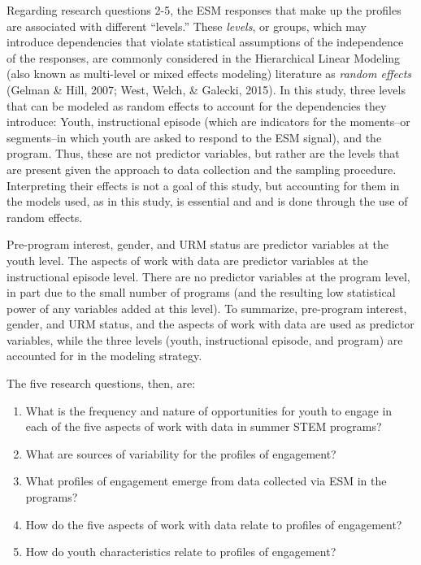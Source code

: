 \documentclass[]{msu-thesis}
\providecommand{\tightlist}{%
  \setlength{\itemsep}{0pt}\setlength{\parskip}{0pt}}
\theoremstyle{definition}
\theoremstyle{definition}
\theoremstyle{definition}
\theoremstyle{remark}
\begin{document}
Regarding research questions 2-5, the ESM responses that make up the
profiles are associated with different ``levels.'' These \emph{levels},
or groups, which may introduce dependencies that violate statistical
assumptions of the independence of the responses, are commonly
considered in the Hierarchical Linear Modeling (also known as
multi-level or mixed effects modeling) literature as \emph{random
effects} (Gelman \& Hill, 2007; West, Welch, \& Galecki, 2015). In this
study, three levels that can be modeled as random effects to account for
the dependencies they introduce: Youth, instructional episode (which are
indicators for the moments--or segments--in which youth are asked to
respond to the ESM signal), and the program. Thus, these are not
predictor variables, but rather are the levels that are present given
the approach to data collection and the sampling procedure. Interpreting
their effects is not a goal of this study, but accounting for them in
the models used, as in this study, is essential and and is done through
the use of random effects.

Pre-program interest, gender, and URM status are predictor variables at
the youth level. The aspects of work with data are predictor variables
at the instructional episode level. There are no predictor variables at
the program level, in part due to the small number of programs (and the
resulting low statistical power of any variables added at this level).
To summarize, pre-program interest, gender, and URM status, and the
aspects of work with data are used as predictor variables, while the
three levels (youth, instructional episode, and program) are accounted
for in the modeling strategy.

The five research questions, then, are:

\begin{enumerate}
\def\labelenumi{\arabic{enumi}.}
\tightlist
\item
  What is the frequency and nature of opportunities for youth to engage
  in each of the five aspects of work with data in summer STEM programs?
\item
  What are sources of variability for the profiles of engagement?
\item
  What profiles of engagement emerge from data collected via ESM in the
  programs?
\item
  How do the five aspects of work with data relate to profiles of
  engagement?
\item
  How do youth characteristics relate to profiles of engagement?
\end{enumerate}
\end{document}
